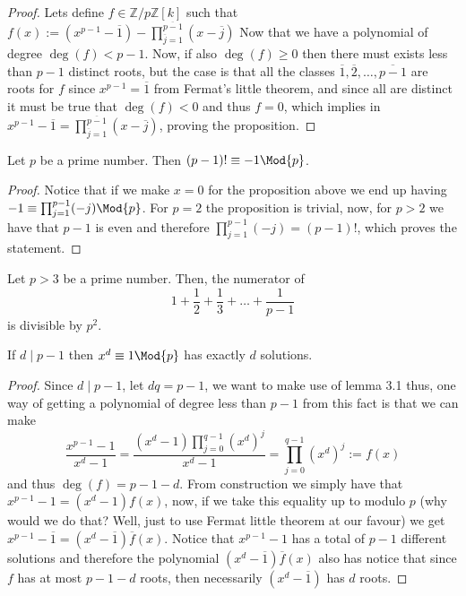 \begin{proof}
    Lets define \(f \in \mathbb{Z}/p\mathbb{Z}[k]\) such that \(f(x) := (x^{p-1}
    - \overline{1}) - \prod_{\overline{j} = 1}^{\overline{p-1}}(x-\overline{j})\)
    Now that we have a polynomial of degree \(\deg(f) < p-1\). Now, if also
    \(\deg(f) \geqslant 0\) then there must exists less than \(p-1\) distinct
    roots, but the case is that all the classes \(\overline{1},
    \overline{2},\dots, \overline{p-1}\) are roots for \(f\) since \(x^{p-1} =
    \overline{1}\) from Fermat's little theorem, and since all are distinct it
    must be true that \(\deg(f) < 0\) and thus \(f = 0\), which implies in
    \(x^{p-1} - \overline{1} = \prod_{\overline{j}=1}^{\overline{p-1}} (x -
    \overline{j})\), proving the proposition.
\end{proof}

\begin{corollary}
    Let \(p\) be a prime number. Then \((p-1)! \equiv -1 \Mod{p}\).
\end{corollary}

\begin{proof}
    Notice that if we make \(x = 0\) for the proposition above we end up having
    \(-1 \equiv \prod_{j=1}^{p-1}(-j) \Mod{p}\). For \(p = 2\) the proposition is
    trivial, now, for \(p > 2\) we have that \(p-1\) is even and therefore
    \(\prod_{j=1}^{p-1}(-j) = (p-1)!\), which proves the statement.
\end{proof}

\begin{proposition}
    Let \(p > 3\) be a prime number. Then, the numerator of
    \[
        1 + \frac{1}{2} + \frac{1}{3} + \dots + \frac{1}{p-1}
    \]
    is divisible by \(p^2\).
\end{proposition}


\begin{proposition}
    If \(d \mid p-1\) then \(x^d \equiv 1 \Mod{p}\) has exactly \(d\) solutions.
\end{proposition}

\begin{proof}
    Since \(d \mid p-1\), let \(dq = p-1\), we want to make use of lemma 3.1
    thus, one way of getting a polynomial of degree less than \(p-1\) from this
    fact is that we can make
    \[
        \frac{x^{p-1} - 1}{x^d - 1} = \frac{(x^d - 1) \prod_{j=0}^{q-1}
            (x^d)^j}{x^d - 1} = \prod_{j=0}^{q-1} (x^d)^{j} := f(x)
    \]
    and thus \(\deg(f) = p-1-d\). From construction we simply have that \(x^{p-1}
    - 1 = (x^d - 1)f(x)\), now, if we take this equality up to modulo \(p\) (why
    would we do that? Well, just to use Fermat little theorem at our favour) we
    get \(x^{p-1} - \overline{1} = (x^d - \overline{1}) \overline{f}(x)\). Notice
    that \(x^{p-1} - 1\) has a total of \(p-1\) different solutions and therefore
    the polynomial \((x^d - \overline{1}) \overline{f}(x)\) also has notice that
    since \(f\) has at most \(p-1-d\) roots, then necessarily \((x^d -
    \overline{1})\) has \(d\) roots.
\end{proof}

